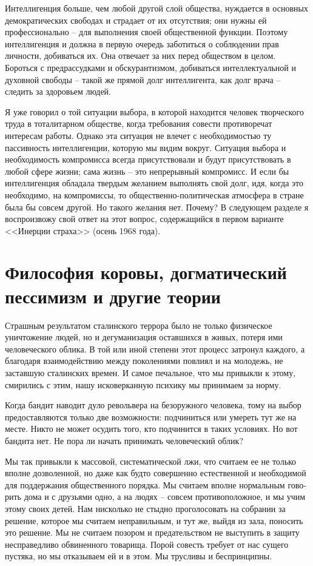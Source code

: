 \documentclass{book}
\begin{document}
Интеллигенция больше, чем любой другой слой общества, нуждается в основных демократических свободах и страдает от их отсутствия; они нужны ей профессионально -- для выполнения своей общественной функции. Поэтому интеллигенция и должна в первую очередь заботиться о соблюдении прав личности, добиваться их. Она отвечает за них перед обществом в целом. Бороться с предрассудками и обскурантизмом, добиваться интеллектуальной и духовной свободы -- такой же прямой долг интеллигента, как долг врача -- следить за здоровьем людей.

Я уже говорил о той ситуации выбора, в которой находится человек творческого труда в тоталитарном обществе, когда требования совести противоречат интересам работы. Однако эта ситуация не влечет с необходимостью ту пассивность интеллигенции, которую мы видим вокруг. Ситуация выбора и необходимость компромисса всегда присутствовали и будут присутствовать в любой сфере жизни; сама жизнь -- это непрерывный компромисс. И если бы интеллигенция обладала твердым желанием выполнять свой долг, идя, когда это необходимо, на компромиссы, то общественно-политическая атмосфера в стране была бы совсем другой. Но такого желания нет. Почему? В следующем разделе я воспроизвожу свой ответ на этот вопрос, содержащийся в первом варианте <<Инерции страха>> (осень 1968 года).


\section{Философия коровы, догматический пессимизм и другие теории}

Страшным результатом сталинского террора было не только физическое уничтожение людей, но и дегуманизация оставшихся в живых, потеря ими человеческого облика. В той или иной степени этот процесс затронул каждого, а благодаря взаимодействию между поколениями повлиял и на молодежь, не заставшую сталинских времен. И самое печальное, что мы привыкли к этому, смирились с этим, нашу исковерканную психику мы принимаем за норму.

Когда бандит наводит дуло револьвера на безоружного че­ловека, тому на выбор предоставляются только две возмож­ности: подчиниться или умереть тут же на месте. Никто не может осудить того, кто подчинится в таких условиях. Но вот бандита нет. Не пора ли начать принимать человеческий облик?

Мы так привыкли к массовой, систематической лжи, что считаем ее не только вполне дозволенной, но даже как будто совершенно естественной и необходимой для поддержания общественного порядка. Мы считаем вполне нормальным гово­рить дома и с друзьями одно, а на людях -- совсем противопо­ложное, и мы учим этому своих детей. Нам нисколько не стыд­но проголосовать на собрании за решение, которое мы счита­ем неправильным, и тут же, выйдя из зала, поносить это реше­ние. Мы не считаем позором и предательством не выступить в защиту несправедливо обвиненного товарища. Порой совесть требует от нас сущего пустяка, но мы отказываем ей и в этом. Мы трусливы и беспринципны.
\end{document}
